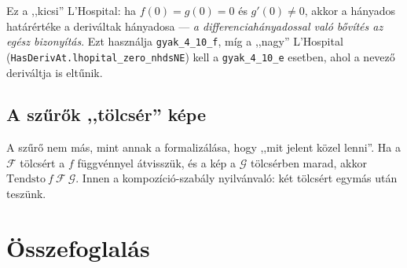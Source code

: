 \documentclass[11pt,a4paper]{article}
\newcommand{\lean}[1]{\texttt{\small #1}}
\theoremstyle{definition}
\begin{document}
\begin{center}
\end{center}
\vspace{8mm}
\noindent
Ez a ,,kicsi'' L'Hospital: ha $f(0)=g(0)=0$ és $g'(0)\ne0$, akkor a hányados
határértéke a deriváltak hányadosa --- \emph{a differenciahányadossal való
bővítés az egész bizonyítás}. Ezt használja \lean{gyak\_4\_10\_f}, míg a
,,nagy'' L'Hospital (\lean{HasDerivAt.lhopital\_zero\_nhdsNE}) kell a
\lean{gyak\_4\_10\_e} esetben, ahol a nevező deriváltja is eltűnik.

\subsection{A szűrők ,,tölcsér'' képe}

\begin{center}
\end{center}
\noindent
A szűrő nem más, mint annak a formalizálása, hogy ,,mit jelent közel lenni''.
Ha a $\mathcal F$ tölcsért a $f$ függvénnyel átvisszük, és a kép a
$\mathcal G$ tölcsérben marad, akkor $\mathrm{Tendsto}\ f\ \mathcal F\ \mathcal G$.
Innen a kompozíció-szabály nyilvánvaló: két tölcsért egymás után teszünk.

\section{Összefoglalás}
\end{document}
